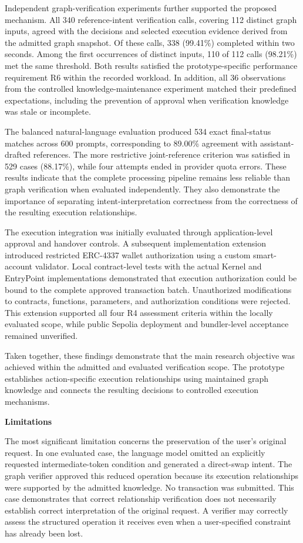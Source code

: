 Independent graph-verification experiments further supported
the proposed mechanism. All 340 reference-intent verification
calls, covering 112 distinct graph inputs, agreed with the
decisions and selected execution evidence derived from the
admitted graph snapshot. Of these calls, 338 (99.41\%) completed
within two seconds. Among the first occurrences of distinct
inputs, 110 of 112 calls (98.21\%) met the same threshold.
Both results satisfied the prototype-specific performance
requirement R6 within the recorded workload. In addition,
all 36 observations from the controlled knowledge-maintenance
experiment matched their predefined expectations, including
the prevention of approval when verification knowledge was
stale or incomplete.

The balanced natural-language evaluation produced 534 exact
final-status matches across 600 prompts, corresponding to
89.00\% agreement with assistant-drafted references. The more
restrictive joint-reference criterion was satisfied in 529
cases (88.17\%), while four attempts ended in provider quota
errors. These results indicate that the complete processing
pipeline remains less reliable than graph verification when
evaluated independently. They also demonstrate the importance
of separating intent-interpretation correctness from the
correctness of the resulting execution relationships.

The execution integration was initially evaluated through
application-level approval and handover controls. A subsequent
implementation extension introduced restricted ERC-4337
wallet authorization using a custom smart-account validator.
Local contract-level tests with the actual Kernel and EntryPoint
implementations demonstrated that execution authorization
could be bound to the complete approved transaction batch.
Unauthorized modifications to contracts, functions, parameters,
and authorization conditions were rejected. This extension
supported all four R4 assessment criteria within the locally
evaluated scope, while public Sepolia deployment and
bundler-level acceptance remained unverified.

Taken together, these findings demonstrate that the main
research objective was achieved within the admitted and
evaluated verification scope. The prototype establishes
action-specific execution relationships using maintained
graph knowledge and connects the resulting decisions to
controlled execution mechanisms.

\medskip
\noindent\textbf{Limitations}

The most significant limitation concerns the preservation
of the user's original request. In one evaluated case,
the language model omitted an explicitly requested
intermediate-token condition and generated a direct-swap
intent. The graph verifier approved this reduced operation
because its execution relationships were supported by the
admitted knowledge. No transaction was submitted. This
case demonstrates that correct relationship verification
does not necessarily establish correct interpretation of
the original request. A verifier may correctly assess the
structured operation it receives even when a user-specified
constraint has already been lost.


